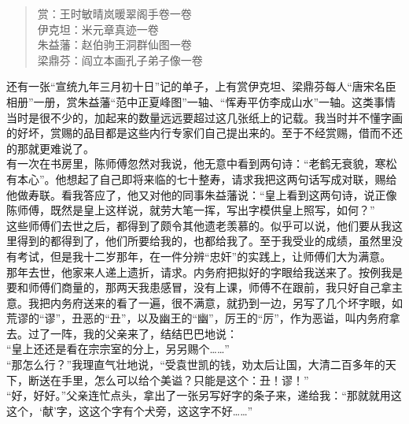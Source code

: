 \begin{quote}
	赏：王时敏晴岚暖翠阁手卷一卷\\

伊克坦：米元章真迹一卷\\

朱益藩：赵伯驹王洞群仙图一卷\\

梁鼎芬：阎立本画孔子弟子像一卷\\
\end{quote}

还有一张“宣统九年三月初十日”记的单子，上有赏伊克坦、梁鼎芬每人“唐宋名臣相册”一册，赏朱益藩“范中正夏峰图”一轴、“恽寿平仿李成山水”一轴。这类事情当时是很不少的，加起来的数量远远要超过这几张纸上的记载。我当时并不懂字画的好坏，赏赐的品目都是这些内行专家们自己提出来的。至于不经赏赐，借而不还的那就更难说了。\\

有一次在书房里，陈师傅忽然对我说，他无意中看到两句诗：“老鹤无衰貌，寒松有本心”。他想起了自己即将来临的七十整寿，请求我把这两句话写成对联，赐给他做寿联。看我答应了，他又对他的同事朱益藩说：“皇上看到这两句诗，说正像陈师傅，既然是皇上这样说，就劳大笔一挥，写出字模供皇上照写，如何？”\\

这些师傅们去世之后，都得到了颇令其他遗老羡慕的。似乎可以说，他们要从我这里得到的都得到了，他们所要给我的，也都给我了。至于我受业的成绩，虽然里没有考试，但是我十二岁那年，在一件分辨“忠奸”的实践上，让师傅们大为满意。\\

那年去世，他家来人递上遗折，请求。内务府把拟好的字眼给我送来了。按例我是要和师傅们商量的，那两天我患感冒，没有上课，师傅不在跟前，我只好自己拿主意。我把内务府送来的看了一遍，很不满意，就扔到一边，另写了几个坏字眼，如荒谬的“谬”，丑恶的“丑”，以及幽王的“幽”，厉王的“厉”，作为恶谥，叫内务府拿去。过了一阵，我的父亲来了，结结巴巴地说：\\

“皇上还还是看在宗宗室的分上，另另赐个……”\\

“那怎么行？”我理直气壮地说，“受袁世凯的钱，劝太后让国，大清二百多年的天下，断送在手里，怎么可以给个美谥？只能是这个：丑！谬！”\\

“好，好好。”父亲连忙点头，拿出了一张另写好字的条子来，递给我：“那就就用这这个，‘献’字，这这个字有个犬旁，这这字不好……”\\

